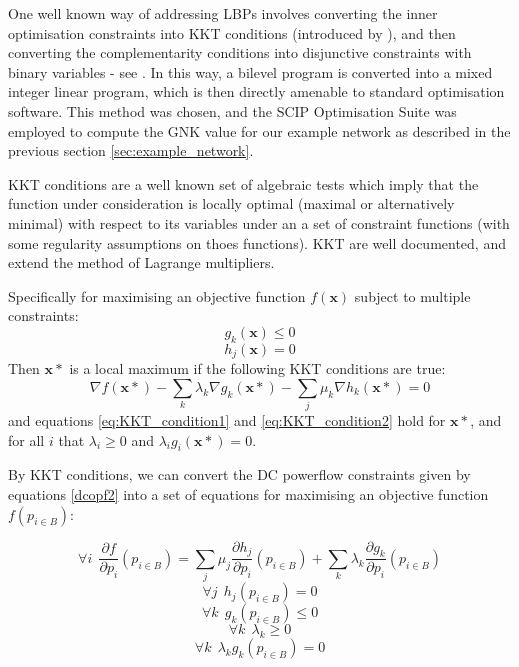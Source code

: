 One well known way of addressing LBPs involves converting the inner optimisation constraints into KKT conditions (introduced by \cite{kuhn1951nonlinear}), and then converting the complementarity conditions into disjunctive constraints with binary variables - see \cite{Fortuny-Amat1981,Pineda2018}.
In this way, a bilevel program is converted into a mixed integer linear program, which is then directly amenable to standard optimisation software.
This method was chosen, and the SCIP Optimisation Suite was employed to compute the GNK value for our example network as described in the previous section \ref{sec:example_network}.

KKT conditions are a well known set of algebraic tests which imply that the function under consideration is locally optimal (maximal or alternatively minimal) with respect to its variables under an a set of constraint functions (with some regularity assumptions on thoes functions).
KKT are well documented, and extend the method of Lagrange multipliers.

Specifically for maximising an objective function $f(\mathbf{x})$ subject to multiple constraints:
\begin{equation}\label{eq:KKT_condition1} g_k(\mathbf{x})\le 0 \end{equation}
\begin{equation}\label{eq:KKT_condition2} h_j(\mathbf{x})=0 \end{equation}
Then $\mathbf{x}*$ is a local maximum if the following KKT conditions are true:
\begin{equation}\label{eq:KKT_conditions3} \nabla f(\mathbf{x}*) - \sum_k\lambda_k\nabla g_k(\mathbf{x}*) - \sum_j\mu_k\nabla h_k(\mathbf{x}*) =0\end{equation}
and equations \ref{eq:KKT_condition1} and \ref{eq:KKT_condition2} hold for $\mathbf{x}*$, and for all $i$ that $\lambda_i\ge 0$ and $\lambda_ig_i(\mathbf{x}*)=0$.

By KKT conditions, we can convert the DC powerflow constraints given by equations \ref{dcopf2} into a set of equations for maximising an objective function $f(p_{i\in B})$:

\begin{equation}\forall i~~\frac{\partial f}{\partial p_i}(p_{i\in B})=\sum_j\mu_j\frac{\partial h_j}{\partial p_i}(p_{i\in B}) + \sum_k\lambda_k\frac{\partial g_k}{\partial p_i}(p_{i\in B})\end{equation}
\begin{equation}\forall j~~ h_j(p_{i\in B})=0\end{equation}
\begin{equation}\forall k~~ g_k(p_{i\in B})\le 0\end{equation}
\begin{equation}\forall k~~ \lambda_k \ge 0\end{equation}
\begin{equation}\label{eq:complementarity_constraint_KKT}\forall k~~ \lambda_kg_k(p_{i\in B}) = 0\end{equation}

